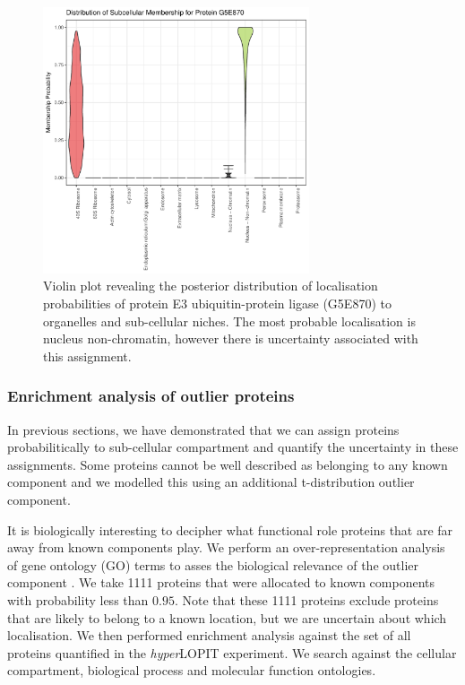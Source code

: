 \documentclass[12pt,english]{article}\usepackage[]{graphicx}\usepackage[]{color}
\newenvironment{knitrout}{}{} %
\begin{document}
\begin{figure}[ht]
\centering
\begin{knitrout}
\color{fgcolor}

{\centering \includegraphics[width=0.7\textwidth]{figure/unnamed-chunk-6-1} 

}



\end{knitrout}

\caption{Violin plot revealing the posterior distribution of
  localisation probabilities of protein E3 ubiquitin-protein ligase
  (G5E870) to organelles and sub-cellular niches.  The most probable
  localisation is nucleus non-chromatin, however there is uncertainty
  associated with this assignment.}
\label{fig:G5E870}
\end{figure}

\clearpage

\subsubsection{Enrichment analysis of outlier proteins}

In previous sections, we have demonstrated that we can assign proteins
probabilitically to sub-cellular compartment and quantify the
uncertainty in these assignments. Some proteins cannot be well
described as belonging to any known component and we modelled this
using an additional t-distribution outlier component.

It is biologically interesting to decipher what functional role
proteins that are far away from known components play. We perform an
over-representation analysis of gene ontology (GO) terms to asses the
biological relevance of the outlier component \citep{Boyle:2004,
  Yu:2012}. We take 1111 proteins that were allocated to known
components with probability less than $0.95$.  Note that these 1111
proteins exclude proteins that are likely to belong to a known
location, but we are uncertain about which localisation.  We then
performed enrichment analysis against the set of all proteins
quantified in the \textit{hyper}LOPIT experiment. We search against
the cellular compartment, biological process and molecular function
ontologies.
\end{document}
